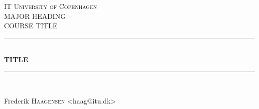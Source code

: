 \begin{titlepage}

\newcommand{\HRule}{\rule{\linewidth}{0.5mm}} %

\center %


\textsc{\LARGE IT University of Copenhagen}\\[1.5cm] %
\textsc{\Large MAJOR HEADING}\\[0.5cm] %
\textsc{\large COURSE TITLE}\\[0.5cm] %


\HRule \\[0.4cm]
{ \huge \bfseries TITLE}\\[0.4cm] %
\HRule \\[1.5cm]


\begin{minipage}{0.4\textwidth}
\begin{flushleft} \large
Frederik \textsc{Haagensen} <haag@itu.dk>
\end{flushleft}
\end{minipage}





\end{titlepage}
